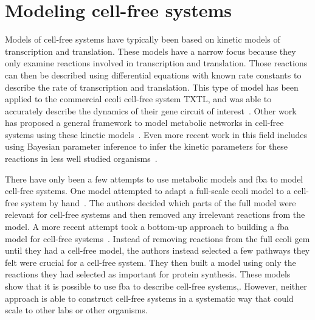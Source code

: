 \section{Modeling cell-free systems}\label{rw:mod-cf}
Models of cell-free systems have typically been based on kinetic models of transcription and translation.
These models have a narrow focus because they only examine reactions involved in transcription and translation.
Those reactions can then be described using differential equations with known rate constants to describe the rate of transcription and translation.
This type of model has been applied to the commercial \gls{ecoli} cell-free system TXTL, and was able to accurately describe the dynamics of their gene circuit of interest~\cite{tuza2013silico}.
Other work has proposed a general framework to model metabolic networks in cell-free systems using these kinetic models~\cite{wayman2015dynamic}.
Even more recent work in this field includes using Bayesian parameter inference to infer the kinetic parameters for these reactions in less well studied organisms~\cite{moore2018rapid}.

There have only been a few attempts to use metabolic models and \gls{fba} to model cell-free systems.
One model attempted to adapt a full-scale \gls{ecoli} model to a cell-free system by hand~\cite{bujara2012silico}.
The authors decided which parts of the full model were relevant for cell-free systems and then removed any irrelevant reactions from the model.
A more recent attempt took a bottom-up approach to building a \gls{fba} model for cell-free systems~\cite{vilkhovoy2017sequence}.
Instead of removing reactions from the full \gls{ecoli} \gls{gem} until they had a cell-free model, the authors instead selected a few pathways they felt were crucial for a cell-free system.
They then built a model using only the reactions they had selected as important for protein synthesis.
These models show that it is possible to use \gls{fba} to describe cell-free systems,.
However, neither approach is able to construct cell-free systems in a systematic way that could scale to other labs or other organisms.


